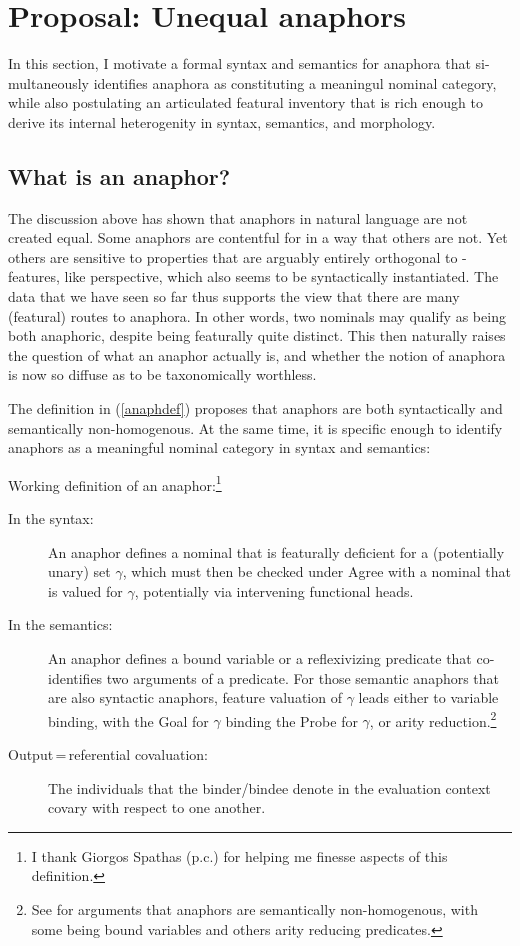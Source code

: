 \documentclass[output=paper, modfonts, nonflat]{langsci/langscibook}
\begin{document}
\section{Proposal: Unequal anaphors}
\label{secclass}
In this section, I motivate a formal syntax and semantics for anaphora that si-
multaneously identifies anaphora as constituting a meaningul nominal category,
while also postulating an articulated featural inventory that is rich enough to
derive its internal heterogenity in syntax, semantics, and morphology.
\subsection{What is an anaphor?}
The discussion above has shown that anaphors in natural language are
not created equal. Some anaphors are contentful for \person{} in a way
that others are not. Yet others are sensitive to properties that are
arguably entirely orthogonal to \ph-features, like perspective, which
also seems to be syntactically instantiated. The data that we have
seen so far thus supports the view that there are many (featural)
routes to anaphora. In other words, two nominals may qualify as being
both anaphoric, despite being featurally quite distinct. This then
naturally raises the question of what an anaphor actually is, and
whether the notion of anaphora is now so diffuse as to be
taxonomically worthless.

The definition in (\ref{anaphdef}) proposes that anaphors are both
syntactically and semantically non-homogenous. At the same time, it is
specific enough to identify anaphors as a meaningful nominal category
in syntax and semantics: 

  \begin{exe}
    \ex\label{anaphdef} Working definition of an
      anaphor:\footnote{I thank Giorgos Spathas (p.c.) for helping me
        finesse aspects of this definition.}
\begin{description}
\item[In the syntax:] An anaphor defines a nominal that is featurally
  deficient for a (potentially unary) set $\gamma$, which must then be
  checked under Agree with a nominal that is valued for $\gamma$,
  potentially via intervening functional heads.
\item[In the semantics:] An anaphor defines a bound variable or a
  reflexivizing predicate that co-identifies two arguments of a
  predicate. For those semantic anaphors that are also syntactic
  anaphors, feature valuation of $\gamma$ leads either to variable
  binding, with the Goal for $\gamma$ binding the Probe for $\gamma$,
  or arity reduction.\footnote{See \citet{spathas:2010, spathas:2015}
    for arguments that anaphors are semantically non-homogenous, with
    some being bound variables and others arity reducing predicates.}
\item[Output\,=\,referential covaluation:] The individuals that the
  binder\slash bindee denote in the evaluation context covary with respect
  to one another. 
  \end{description}
\end{exe}
\end{document}
